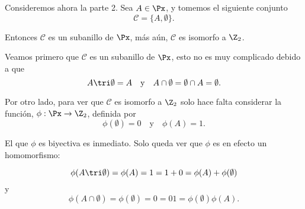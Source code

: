 \begin{sol}
		Consideremos ahora la parte 2. Sea $A\in \Px$, y tomemos el siguiente conjunto
		\[ \mathcal{C} = \{ A,\emptyset \}. \]
		
		Entonces $\mathcal{C}$ es un subanillo de $\Px$, más aún, $\mathcal{C}$ es isomorfo a $\Z_2$.
		
		Veamos primero que $\mathcal{C}$ es un subanillo de $\Px$, esto no es muy complicado debido a que
		\[ A \tri \emptyset = A \quad \text{y} \quad  A \cap \emptyset = \emptyset \cap A = \emptyset. \]
		
		Por otro lado, para ver que $\mathcal{C}$ es isomorfo a $\Z_2$ solo hace falta considerar la función, $\phi: \Px \to \Z_2$, definida por
		\[ \phi(\emptyset) = 0 \quad \text{y} \quad \phi(A) = 1. \]
		
		El que $\phi$ es biyectiva es  inmediato. Solo queda ver que $\phi$ es en efecto un homomorfismo:
		
		\[ \phi (A \tri \emptyset) = \phi (A) = 1 = 1+0 = \phi(A) + \phi(\emptyset) \]
		y
		\[ \phi(A \cap \emptyset) = \phi(\emptyset) = 0 = 01 = \phi(\emptyset)\phi(A). \]
	\end{sol}

